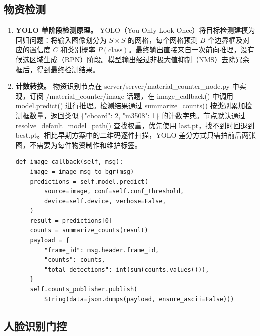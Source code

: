 \documentclass[12pt]{article}
\newcommand{\code}[1]{{\ttfamily #1}}
\begin{document}
\subsection{物资检测}

\begin{enumerate}
	\item \textbf{YOLO 单阶段检测原理。} YOLO（You Only Look Once）将目标检测建模为回归问题：将输入图像划分为 $S \times S$ 的网格，每个网格预测 $B$ 个边界框及对应的置信度 $C$ 和类别概率 $P(\text{class})$。最终输出直接来自一次前向推理，没有候选区域生成（RPN）阶段。模型输出经过非极大值抑制（NMS）去除冗余框后，得到最终检测结果。

	\item \textbf{计数转换。} 物资识别节点在 \code{server/server/material\_counter\_node.py} 中实现，订阅 \code{/material\_counter/image} 话题，在 \code{image\_callback()} 中调用 \code{model.predict()} 进行推理。检测结果通过 \code{summarize\_counts()} 按类别累加检测框数量，返回类似 \code{\{"cboard": 2, "m3508": 1\}} 的计数字典。节点默认通过 \code{resolve\_default\_model\_path()} 查找权重，优先使用 \code{last.pt}，找不到时回退到 \code{best.pt}。相比早期方案中的二维码逐件扫描，YOLO 差分方式只需拍前后两张图，不需要为每件物资制作和维护标签。

	      \begin{lstlisting}[caption={物资检测节点回调逻辑（\code{material\_counter\_node.py}）},label={lst:material-counter}]
def image_callback(self, msg):
    image = image_msg_to_bgr(msg)
    predictions = self.model.predict(
        source=image, conf=self.conf_threshold,
        device=self.device, verbose=False,
    )
    result = predictions[0]
    counts = summarize_counts(result)
    payload = {
        "frame_id": msg.header.frame_id,
        "counts": counts,
        "total_detections": int(sum(counts.values())),
    }
    self.counts_publisher.publish(
        String(data=json.dumps(payload, ensure_ascii=False)))
\end{lstlisting}
\end{enumerate}

\subsection{人脸识别门控}
\end{document}

